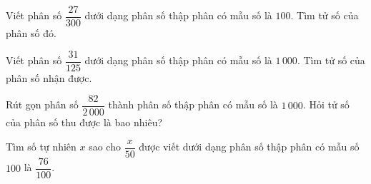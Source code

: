 \begin{ex} %
Viết phân số $\dfrac{27}{300}$ dưới dạng phân số thập phân có mẫu số là $100$. Tìm tử số của phân số đó.
\end{ex}

\begin{ex} %
Viết phân số $\dfrac{31}{125}$ dưới dạng phân số thập phân có mẫu số là $1\,000$. Tìm tử số của phân số nhận được.
\end{ex}

\begin{ex} %
Rút gọn phân số $\dfrac{82}{2\,000}$ thành phân số thập phân có mẫu số là $1\,000$. Hỏi tử số của phân số thu được là bao nhiêu?
\end{ex}

\begin{ex} %
Tìm số tự nhiên $x$ sao cho $\dfrac{x}{50}$ được viết dưới dạng phân số thập phân có mẫu số $100$ là $\dfrac{76}{100}$.
\end{ex}

